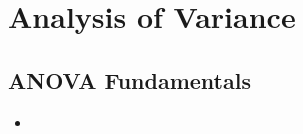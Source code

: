 \chapter{Analysis of Variance}

\section{ANOVA Fundamentals}
\begin{itemize}
  \item 
\end{itemize}
